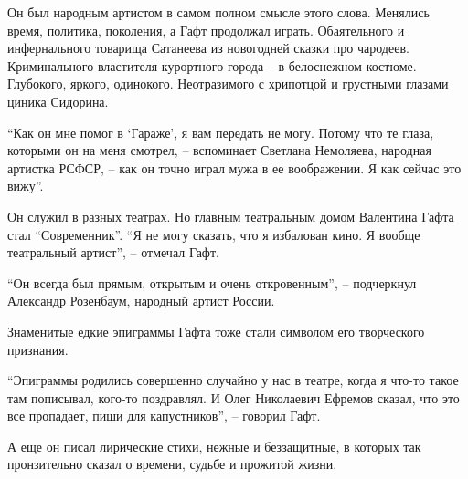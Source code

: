 Он был народным артистом в самом полном смысле этого слова. Менялись время,
политика, поколения, а Гафт продолжал играть. Обаятельного и инфернального
товарища Сатанеева из новогодней сказки про чародеев. Криминального властителя
курортного города – в белоснежном костюме. Глубокого, яркого, одинокого.
Неотразимого с хрипотцой и грустными глазами циника Сидорина.

\enquote{Как он мне помог в 
\enquote{Гараже}, я вам передать не могу. Потому что те глаза,
которыми он на меня смотрел, – вспоминает Светлана Немоляева, народная артистка
РСФСР, – как он точно играл мужа в ее воображении. Я как сейчас это вижу}.

Он служил в разных театрах. Но главным театральным домом Валентина Гафта стал
\enquote{Современник}. \enquote{Я не могу сказать, что я избалован кино. Я вообще театральный
артист}, – отмечал Гафт.

\enquote{Он всегда был прямым, открытым и очень откровенным}, – подчеркнул Александр
Розенбаум, народный артист России.

Знаменитые едкие эпиграммы Гафта тоже стали символом его творческого признания.

\enquote{Эпиграммы родились совершенно случайно у нас в театре, когда я что-то такое
там пописывал, кого-то поздравлял. И Олег Николаевич Ефремов сказал, что это
все пропадает, пиши для капустников}, – говорил Гафт.

А еще он писал лирические стихи, нежные и беззащитные, в которых так
пронзительно сказал о времени, судьбе и прожитой жизни.
